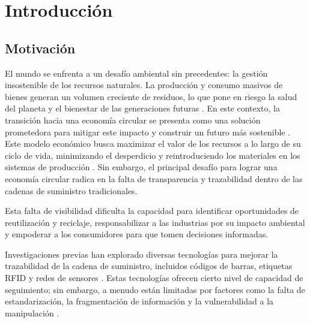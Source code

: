 \chapter[Introducción]{Introducción}
\label{cp:introduction}

\parindent0pt

\section{Motivación}

El mundo se enfrenta a un desafío ambiental sin precedentes: la gestión insostenible de los recursos naturales. La producción y consumo masivos de bienes generan un volumen creciente de residuos, lo que pone en riesgo la salud del planeta y el bienestar de las generaciones futuras \cite{IPCC2022, pelegri2021ipcc}. En este contexto, la transición hacia una economía circular se presenta como una solución prometedora para mitigar este impacto y construir un futuro más sostenible \cite{clima2022book}. Este modelo económico busca maximizar el valor de los recursos a lo largo de su ciclo de vida, minimizando el desperdicio y reintroduciendo los materiales en los sistemas de producción \cite{da2022economia, melendez2021economia}. Sin embargo, el principal desafío para lograr una economía circular radica en la falta de transparencia y trazabilidad dentro de las cadenas de suministro tradicionales.

Esta falta de visibilidad dificulta la capacidad para identificar oportunidades de reutilización y reciclaje, responsabilizar a las industrias por su impacto ambiental y empoderar a los consumidores para que tomen decisiones informadas. 

Investigaciones previas han explorado diversas tecnologías para mejorar la trazabilidad de la cadena de suministro, incluidos códigos de barras, etiquetas RFID y redes de sensores \cite{schuitemaker2020product}. Estas tecnologías ofrecen cierto nivel de capacidad de seguimiento; sin embargo, a menudo están limitadas por factores como la falta de estandarización, la fragmentación de información y la vulnerabilidad a la manipulación \cite{schuitemaker2020product}.

